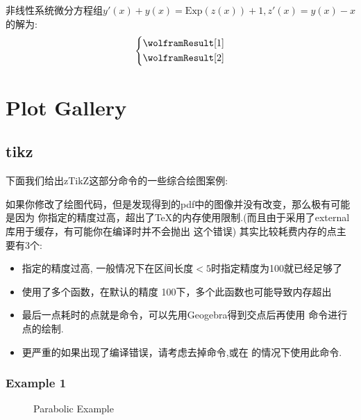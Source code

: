 \documentclass[
  hyper,    
  lang=cn,
  class=book,
  bib_index={load},
  mathSpec={envStyle=leftbar, alias},
  toc={column=2, title=目录},
]{zlatex}
\let\cmd\zlatexVerb
\begin{document}
非线性系统微分方程组$y'(x) + y(x) = \mathrm{Exp}(z(x))+1, z'(x) = y(x)-x$的解为:
\begin{align}
    \left\{\begin{aligned}
        & \wolframResult[1]\\ 
        & \wolframResult[2] 
    \end{aligned}\right.
\end{align}







\section{Plot Gallery}\label{sec:gallery}
\subsection{tikz}
下面我们给出zTikZ这部分命令的一些综合绘图案例:
\begin{leftbar}
\noindent 如果你修改了绘图代码，但是发现得到的pdf中的图像并没有改变，那么极有可能是因为
你指定的精度过高，超出了\TeX{}的内存使用限制.(而且由于采用了external库用于缓存，有可能你在编译时并不会抛出
这个错误) 其实比较耗费内存的点主要有3个:
\begin{itemize}
    \item 指定的精度过高, 一般情况下在区间长度$<5$时指定精度为100就已经足够了
    \item 使用了多个\cmd{\ContourPlot}函数，在默认的精度 100下，多个此函数也可能导致内存超出
    \item 最后一点耗时的点就是\cmd{\ShowIntersecion}命令，可以先用Geogebra得到交点后再使用
        \cmd{\ShowPoint}命令进行点的绘制.
    \item 更严重的如果出现了编译错误，请考虑去掉\cmd{\ShadePlot}命令,或在\cmd{\usepackage[external=false]{ztikz}}
        的情况下使用此命令.
\end{itemize}
\end{leftbar}


\subsubsection{Example 1}
\begin{figure}[!htb]
    \centering
    
    \caption{Parabolic Example}
    \label{fig:1-parabolic}
\end{figure}
\inputminted{latex}{./example_1.tex}
\newpage
\end{document}
